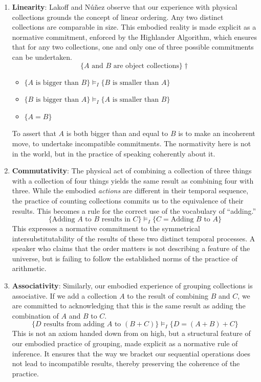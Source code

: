 \documentclass[12pt]{book}
\begin{document}
\begin{enumerate}
    \item \textbf{Linearity}: Lakoff and Núñez observe that our experience with physical collections grounds the concept of linear ordering. Any two distinct collections are comparable in size. This embodied reality is made explicit as a normative commitment, enforced by the Highlander Algorithm, which ensures that for any two collections, one and only one of three possible commitments can be undertaken.
    \[
    \{ A \text{ and } B \text{ are object collections} \} \dagger
    \]
    \begin{itemize}
        \item \(\{ A \text{ is bigger than } B \} \vDash_{I} \{ B \text{ is smaller than } A \}\)
        \item \(\{ B \text{ is bigger than } A \} \vDash_{I} \{ A \text{ is smaller than } B \}\)
        \item \(\{ A = B \}\)
    \end{itemize}
    To assert that \(A\) is both bigger than and equal to \(B\) is to make an incoherent move, to undertake incompatible commitments. The normativity here is not in the world, but in the practice of speaking coherently about it.

    \item \textbf{Commutativity}: The physical act of combining a collection of three things with a collection of four things yields the same result as combining four with three. While the embodied \textit{actions} are different in their temporal sequence, the practice of counting collections commits us to the equivalence of their results. This becomes a rule for the correct use of the vocabulary of ``adding.''
    \[
    \{ \text{Adding } A \text{ to } B \text{ results in } C \} \vDash_{I} \{ C = \text{Adding } B \text{ to } A \}
    \]
    This expresses a normative commitment to the symmetrical intersubstitutability of the results of these two distinct temporal processes. A speaker who claims that the order matters is not describing a feature of the universe, but is failing to follow the established norms of the practice of arithmetic.

    \item \textbf{Associativity}: Similarly, our embodied experience of grouping collections is associative. If we add a collection \(A\) to the result of combining \(B\) and \(C\), we are committed to acknowledging that this is the same result as adding the combination of \(A\) and \(B\) to \(C\).
    \[
    \{ D \text{ results from adding } A \text{ to } (B + C) \} \vDash_{I} \{ D = (A + B) + C \}
    \]
    This is not an axiom handed down from on high, but a structural feature of our embodied practice of grouping, made explicit as a normative rule of inference. It ensures that the way we bracket our sequential operations does not lead to incompatible results, thereby preserving the coherence of the practice.


\end{enumerate}
\end{document}

